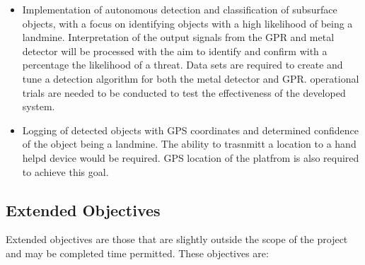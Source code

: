 \documentclass[main.tex]{subfiles}
\begin{document}
\begin{itemize}
\item Implementation of autonomous detection and classification of subsurface objects, with a focus on identifying objects with a high likelihood of being a landmine. Interpretation of the output signals from the GPR and metal detector will be processed with the aim to identify and confirm with a percentage the likelihood of a threat. %
Data sets are required to create and tune a detection algorithm for both the metal detector and GPR. operational trials are needed to be conducted to test the effectiveness of the developed system. 
\item Logging of detected objects with GPS coordinates and determined confidence of the object being a landmine. The ability to trasnmitt a location to a hand helpd device would be required. GPS location of the platfrom is also required to achieve this goal.  %
\end{itemize}

\subsection{Extended Objectives}
Extended objectives are those that are slightly outside the scope of the project and may be completed time permitted. These objectives are:
\end{document}
